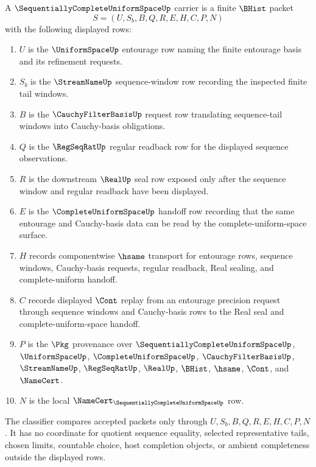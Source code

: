 \begin{definition}
\label{def:sequentially-complete-uniform-space-carrier}
A $\SequentiallyCompleteUniformSpaceUp$ carrier is a finite $\BHist$ packet
$$
S=(U,S_b,B,Q,R,E,H,C,P,N)
$$
with the following displayed rows:
\begin{enumerate}
\item $U$ is the $\UniformSpaceUp$ entourage row naming the finite entourage basis and its refinement requests.
\item $S_b$ is the $\StreamNameUp$ sequence-window row recording the inspected finite tail windows.
\item $B$ is the $\CauchyFilterBasisUp$ request row translating sequence-tail windows into Cauchy-basis obligations.
\item $Q$ is the $\RegSeqRatUp$ regular readback row for the displayed sequence observations.
\item $R$ is the downstream $\RealUp$ seal row exposed only after the sequence window and regular readback have been displayed.
\item $E$ is the $\CompleteUniformSpaceUp$ handoff row recording that the same entourage and Cauchy-basis data can be read by the complete-uniform-space surface.
\item $H$ records componentwise $\hsame$ transport for entourage rows, sequence windows, Cauchy-basis requests, regular readback, Real sealing, and complete-uniform handoff.
\item $C$ records displayed $\Cont$ replay from an entourage precision request through sequence windows and Cauchy-basis rows to the Real seal and complete-uniform-space handoff.
\item $P$ is the $\Pkg$ provenance over $\SequentiallyCompleteUniformSpaceUp$, $\UniformSpaceUp$, $\CompleteUniformSpaceUp$, $\CauchyFilterBasisUp$, $\StreamNameUp$, $\RegSeqRatUp$, $\RealUp$, $\BHist$, $\hsame$, $\Cont$, and $\NameCert$.
\item $N$ is the local $\NameCert_{\SequentiallyCompleteUniformSpaceUp}$ row.
\end{enumerate}
The classifier compares accepted packets only through $U,S_b,B,Q,R,E,H,C,P,N$. It has no coordinate for quotient sequence equality, selected representative tails, chosen limits, countable choice, host completion objects, or ambient completeness outside the displayed rows.
\end{definition}

